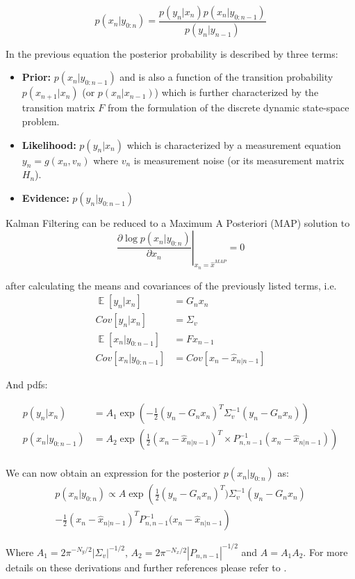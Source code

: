 \documentclass[a4paper,10pt]{article}
\DeclareMathOperator{\E}{\mathbb{E}}
\begin{document}
\begin{equation}
 p(x_n|y_{0:n}) = \frac{p(y_n|x_n)p(x_n|y_{0:n-1})}{p(y_n|y_{n-1})}
\end{equation}

In the previous equation the posterior probability is described by three terms:
\begin{itemize}
 \item \textbf{Prior:} $p(x_n|y_{0:n-1})$ and is also a function of the transition probability $p(x_{n+1}|x_n)$ (or $p(x_{n}|x_{n-1})$) which is further characterized by the transition matrix $F$ from the formulation of the discrete dynamic state-space problem. 
 \item \textbf{Likelihood:} $p(y_n|x_n)$ which is characterized by a measurement equation $y_n = g(x_n, v_n)$ where $v_n$ is measurement noise (or its measurement matrix $H_n$).
 \item \textbf{Evidence:} $p(y_n|y_{0:n-1})$
\end{itemize}

Kalman Filtering can be reduced to a Maximum A Posteriori (MAP) solution to
\begin{equation}
 \left.\frac{\partial \log p(x_n|y_{0:n})}{\partial x_n}\right\vert_{x_n = \hat{x}^{MAP}} = 0
\end{equation}

after calculating the means and covariances of the previously listed terms, i.e.
\begin{equation}
\begin{aligned}
 \E[y_n|x_n]        &= G_n x_n\\
 Cov[y_n|x_n]       &= \Sigma_v\\
 \E[x_n|y_{0:n-1}]   &= Fx_{n-1}\\
 Cov[x_n|y_{0:n-1}] &= Cov[x_n - \hat{x}_{n|n-1}]
\end{aligned}
\end{equation}


And pdfs:

\begin{align}
 p(y_n|x_n)       &= A_1 \exp(-\frac{1}{2}(y_n - G_n x_n)^T \Sigma^{-1}_v (y_n - G_n x_n)) \\
 p(x_n|y_{0:n-1}) &= A_2 \exp(\frac{1}{2}(x_n - \hat{x}_{n|n-1})^T \times P^{-1}_{n,n-1}(x_n - \hat{x}_{n|n-1}))\\
\end{align}

We can now obtain an expression for the posterior $p(x_n|y_{0:n})$ as:
\begin{multline}
 p(x_n|y_{0:n}) \propto A \exp\left(\frac{1}{2} (y_n - G_n x_n)^T) \Sigma^{-1}_v (y_n - G_n x_n) \\
		 \left.- \frac{1}{2}(x_n - \hat{x}_{n|n-1})^T P^{-1}_{n,n-1}(x_n - \hat{x}_{n|n-1}\right)
\end{multline}

Where $A_1 = 2\pi^{-N_y/2}|\Sigma_v|^{-1/2}$, $A_2 = 2\pi^{-N_x/2}|P_{n,n-1}|^{-1/2}$ and $A=A_1 A_2$. 
For more details on these derivations and further references please refer to \cite{Chen2003}.


 

\end{document}
